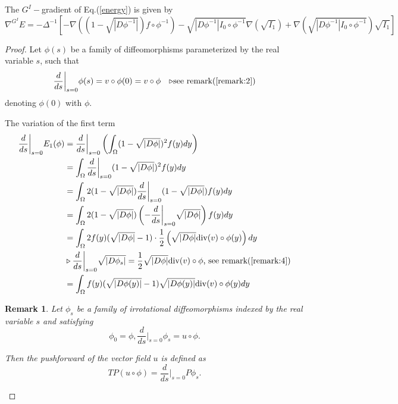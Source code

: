 \documentclass{article}
\theoremstyle{definition}
\theoremstyle{plain}
\newtheorem{remark}{Remark}
\begin{document}
The $G^I-$gradient of Eq.(\ref{energy}) is given by
\begin{equation*}
    \nabla^{G^I}E=-\Delta^{-1}\left[-\nabla\left(\left(1-\sqrt{|D\phi^{-1}|}\right)f\circ\phi^{-1}\right)-\sqrt{|D\phi^{-1}|I_0\circ\phi^{-1}}\nabla\left(\sqrt{I_1}\right)+\nabla\left(\sqrt{|D\phi^{-1}|I_0\circ\phi^{-1}}\right)\sqrt{I_1}\right]
\end{equation*}
\begin{proof}
Let $\phi(s)$ be a family of diffeomorphisms parameterized by the real variable $s$, such that
\begin{align*}
    \frac{d}{ds}\bigg\rvert_{s=0}\phi(s)=v\circ\phi(0)=v\circ\phi&&\triangleright\text{see remark(\ref{remark:2})}
\end{align*}
denoting $\phi(0)$ with $\phi$.

The variation of the first term
\begin{align*}
    \frac{d}{ds}\bigg\rvert_{s=0}E_1(\phi)&=\frac{d}{ds}\bigg\rvert_{s=0}\left(\int_\Omega(1-\sqrt{|D\phi|})^2f(y)dy\right)\\
    &=\int_\Omega\frac{d}{ds}\bigg\rvert_{s=0}(1-\sqrt{|D\phi|})^2f(y)dy\\
    &=\int_\Omega2(1-\sqrt{|D\phi|})\frac{d}{ds}\bigg\rvert_{s=0}(1-\sqrt{|D\phi|})f(y)dy\\
    &=\int_\Omega2(1-\sqrt{|D\phi|})\left(-\frac{d}{ds}\bigg\rvert_{s=0}\sqrt{|D\phi|}\right)f(y)dy\\
    &=\int_\Omega2f(y)(\sqrt{|D\phi|}-1)\cdot\frac{1}{2}\left(\sqrt{|D\phi|}\mathrm{div}(v)\circ\phi(y)\right)dy \\ &\triangleright\frac{d}{ds}\bigg\rvert_{s=0}\sqrt{|D\phi_s|}=\frac{1}{2}\sqrt{|D\phi|}\mathrm{div}(v)\circ\phi\text{, see remark(\ref{remark:4})}\\
    &=\int_\Omega f(y)(\sqrt{|D\phi(y)|}-1)\sqrt{|D\phi(y)|}\mathrm{div}(v)\circ\phi(y)dy
\end{align*}

\begin{remark}\label{remark:4}\cite{hinkle}
Let $\phi_s$ be a family of irrotational diffeomorphisms indexed by the real variable $s$ and satisfying
\begin{equation*}
    \phi_0=\phi, \frac{d}{ds}\bigg\rvert_{s=0}\phi_s=u\circ\phi.
\end{equation*}

Then the pushforward of the vector field $u$ is defined as
\begin{equation*}
    TP(u\circ\phi)=\frac{d}{ds}\bigg\rvert_{s=0}P\phi_s.
\end{equation*}


\end{remark}
\end{proof}
\end{document}
